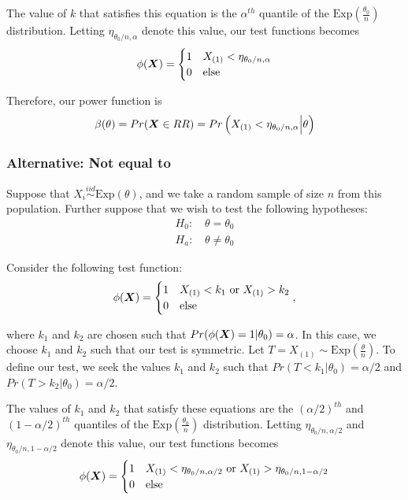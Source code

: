 \documentclass[]{article}
\newcommand{\bfX}{\mbox{\boldmath $X$}}
\begin{document}
The value of $k$ that satisfies this equation is the $\alpha^{th}$ quantile of the $\text{Exp}(\frac{\theta_0}{n})$ distribution. Letting $\eta_{\theta_0/n, \alpha}$ denote this value, our test functions becomes
\[
\phi(\bfX) = \begin{cases}
1 & X_{(1)} < \eta_{\theta_0/n, \alpha} \\
0 & \text{else}
\end{cases}
\]

Therefore, our power function is
\[
\beta(\theta) = Pr(\bfX \in RR) = Pr\left(X_{(1)} < \eta_{\theta_0/n, \alpha} \Big| \theta\right)
\]

\subsubsection{Alternative: Not equal to}

Suppose that $X_i \stackrel{iid}{\sim} \text{Exp}(\theta)$, and we take a random sample of size $n$ from this population. Further suppose that we wish to test the following hypotheses:
\[
\begin{split}
\text{$H_0$: }& \theta = \theta_0 \\
\text{$H_a$: }& \theta \neq \theta_0
\end{split}
\]

Consider the following test function:
\[
\phi(\bfX) = \begin{cases}
1 & X_{(1)} < k_1 \text{ or } X_{(1)} > k_2 \\
0 & \text{else}
\end{cases},
\]

where $k_1$ and $k_2$ are chosen such that $Pr(\phi(\bfX) = 1|\theta_0) = \alpha$. In this case, we choose $k_1$ and $k_2$ such that our test is symmetric. Let $T = X_{(1)} \sim \text{Exp}(\frac{\theta}{n})$. To define our test, we seek the values $k_1$ and $k_2$ such that $Pr(T < k_1 | \theta_0) = \alpha/2$ and $Pr(T > k_2 | \theta_0) = \alpha/2$. 

The values of $k_1$ and $k_2$ that satisfy these equations are the $(\alpha/2)^{th}$ and $(1 - \alpha/2)^{th}$ quantiles of the $\text{Exp}(\frac{\theta_0}{n})$ distribution. Letting $\eta_{\theta_0/n, \alpha/2}$ and $\eta_{\theta_0/n, 1 - \alpha/2}$ denote this value, our test functions becomes
\[
\phi(\bfX) = \begin{cases}
1 & X_{(1)} < \eta_{\theta_0/n, \alpha/2} \text{ or } X_{(1)} > \eta_{\theta_0/n, 1 - \alpha/2}\\
0 & \text{else}
\end{cases}
\]
\end{document}
